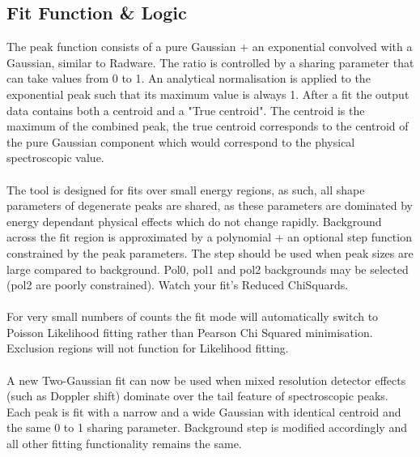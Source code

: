 \documentclass[a4paper,10pt]{article}
\begin{document}
\subsection{Fit Function \& Logic}
The peak function consists of a pure Gaussian + an exponential convolved with a Gaussian, similar to Radware. The ratio is controlled by a sharing parameter that can take values from 0 to 1. An analytical normalisation is applied to the exponential peak such that its maximum value is always 1. After a fit the output data contains both a centroid and a "True centroid". The centroid is the maximum of the combined peak, the true centroid corresponds to the centroid of the pure Gaussian component which would correspond to the physical spectroscopic value.  
\\
\\
The tool is designed for fits over small energy regions, as such, all shape parameters of degenerate peaks are shared, as these parameters are dominated by energy dependant physical effects which do not change rapidly. Background across the fit region is approximated by a polynomial + an optional step function constrained by the peak parameters. The step should be used when peak sizes are large compared to background. Pol0, pol1 and pol2 backgrounds may be selected (pol2 are poorly constrained). Watch your fit's Reduced ChiSquards.
\\
\\
For very small numbers of counts the fit mode will automatically switch to Poisson Likelihood fitting rather than Pearson Chi Squared minimisation. Exclusion regions will not function for Likelihood fitting.
\\
\\
A new Two-Gaussian fit can now be used when mixed resolution detector effects (such as Doppler shift) dominate over the tail feature of spectroscopic peaks. Each peak is fit with a narrow and a wide Gaussian with identical centroid and the same 0 to 1 sharing parameter. Background step is modified accordingly and all other fitting functionality remains the same.
\end{document}
